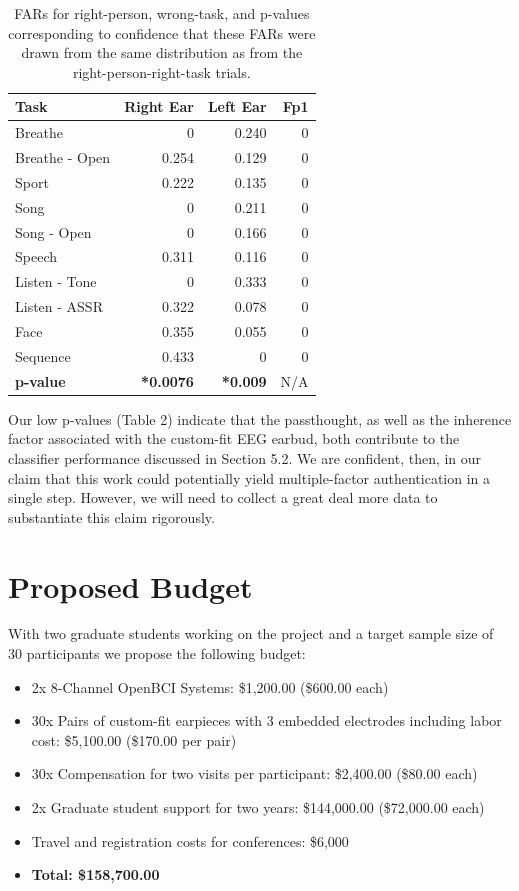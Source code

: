 \documentclass[11pt]{article}
\begin{document}
\begin{table}[h]
\caption{FARs for right-person, wrong-task, and p-values corresponding to confidence that these FARs were drawn from the same distribution as from the right-person-right-task trials.}
\centering
\begin{tabular}{lrrr}
\textbf{Task} & \textbf{Right Ear} & \textbf{Left Ear} & \textbf{Fp1}\\
\hline
Breathe & 0 & 0.240 & 0\\
Breathe - Open & 0.254 & 0.129 & 0\\
Sport & 0.222 & 0.135 & 0\\
Song & 0 & 0.211 & 0\\
Song - Open & 0 & 0.166 & 0\\
Speech & 0.311 & 0.116 & 0\\
Listen - Tone & 0 & 0.333 & 0\\
Listen - ASSR & 0.322 & 0.078 & 0\\
Face & 0.355 & 0.055 & 0\\
Sequence & 0.433 & 0 & 0\\
\hline
\textbf{p-value} & \textbf{*0.0076} & \textbf{*0.009} & N/A\\
\end{tabular}
\end{table}

Our low p-values (Table 2) indicate that the passthought, as well as the inherence
factor associated with the custom-fit EEG earbud, both contribute to the classifier
performance discussed in Section 5.2. We are confident, then, in our claim that this work
could potentially yield multiple-factor authentication in a single step. However, we
will need to collect a great deal more data to substantiate this claim rigorously.

\section{Proposed Budget}
\label{sec:org7b5c0f3}
With two graduate students working on the project and a target sample size of 30 participants
we propose the following budget:

\begin{itemize}
\item 2x 8-Channel OpenBCI Systems: \$1,200.00 (\$600.00 each)
\item 30x Pairs of custom-fit earpieces with 3 embedded electrodes including labor cost: \$5,100.00 (\$170.00 per pair)
\item 30x Compensation for two visits per participant: \$2,400.00 (\$80.00 each)
\item 2x Graduate student support for two years: \$144,000.00 (\$72,000.00 each)
\item Travel and registration costs for conferences: \$6,000
\item \textbf{Total: \$158,700.00}
\end{itemize}
\end{document}
